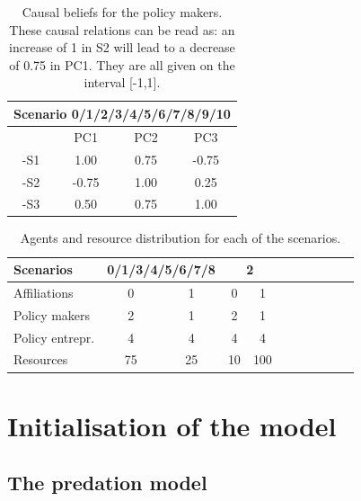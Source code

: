 \documentclass[12pt]{article}
\begin{document}
\begin{table}[h!]
\begin{center}
\begin{tabular}{ |c|c|c|c|}
\hline
\multicolumn{4}{|c|}{ {\bfseries Scenario 0/1/2/3/4/5/6/7/8/9/10}}	
								\\ \hline \hline
	& PC1	& PC2	& PC3		\\ \hline
-S1 	& 1.00	& 0.75	&-0.75		\\ \hline
-S2 	&-0.75	& 1.00	& 0.25 		\\ \hline
-S3 	& 0.50	& 0.75	& 1.00		\\ 
\hline
\end{tabular}
\end{center}
\caption{Causal beliefs for the policy makers. These causal relations can be read as: an increase of 1 in S2 will lead to a decrease of 0.75 in PC1. They are all given on the interval [-1,1].}
\label{tab:causalBeliefs}
\end{table}

\begin{table}[h!]
\begin{center}
\begin{tabular}{ |l||c|c||c|c||c|c||c|c||c|c| } 
\hline
 {\bfseries Scenarios}
 				& \multicolumn{2}{|c||}{ {\bfseries 0/1/3/4/5/6/7/8}}	
						& \multicolumn{2}{|c||}{ {\bfseries 2}}	
														\\ \hline \hline
Affiliations			& 0	& 1	& 0	& 1		\\ \hline
Policy makers 		& 2	& 1	& 2	& 1		\\ \hline
Policy entrepr.		& 4	& 4	& 4	& 4		\\ \hline
Resources		& 75	& 25	& 10	& 100	\\ \hline
\end{tabular}
\end{center}
\caption{Agents and resource distribution for each of the scenarios.}
\label{tab:agentResourceDistribution}
\end{table}


\section{Initialisation of the model}
\label{sec:initialisation}

\subsection{The predation model}
\end{document}
